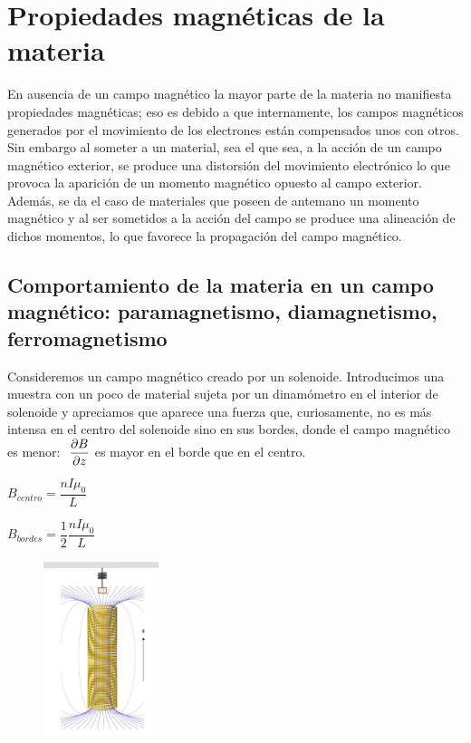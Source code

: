 \chapter{Propiedades magnéticas de la materia}

\begin{miparrafo}
	En ausencia de un campo magnético la mayor parte de la materia no manifiesta propiedades magnéticas; eso es debido a que internamente, los campos magnéticos generados por el movimiento de los electrones están compensados unos con otros. Sin embargo al someter a un material, sea el que sea, a la acción de un campo magnético exterior, se produce una distorsión del movimiento electrónico lo que provoca la aparición de un momento magnético opuesto al campo exterior. Además, se da el caso de materiales que poseen de antemano un momento magnético y al ser sometidos a la acción del campo se produce una alineación de dichos momentos, lo que favorece la propagación del campo magnético.
\end{miparrafo}


\section[Comportamiento de la materia en un campo magnético: paramagnetismo, diamagnetismo, ferromagnetismo]{Comportamiento de la materia en un campo magnético: paramagnetismo, diamagnetismo, ferromagnetismo}


\begin{multicols}{2}
Consideremos un campo magnético creado por un solenoide. Introducimos una muestra con un poco de material sujeta por un dinamómetro en el interior de solenoide y apreciamos que aparece una fuerza que, curiosamente, no es más intensa en el centro del solenoide sino en sus bordes, donde el campo magnético es menor:
$\ \displaystyle \pdv{B}{z}$ es mayor en el borde que en el centro.

$B_{centro}=\dfrac{nI\mu_0}{L}$ 

$B_{bordes}=\dfrac 1 2 \dfrac{nI\mu_0}{L}$
\begin{figure}[H]
	\centering
	\includegraphics[width=0.3\textwidth]{imagenes/imagenes28/T28IM01.png}
\end{figure}	
\end{multicols}

